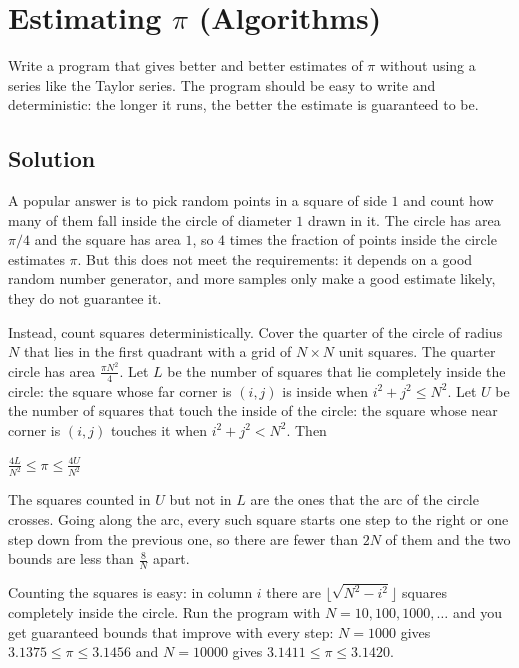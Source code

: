 \section {Estimating $\pi$ (Algorithms)}

Write a program that gives better and better estimates of $\pi$ without using a series like the Taylor series.
The program should be easy to write and deterministic: the longer it runs, the better the estimate is guaranteed to be.

\subsection{Solution}

A popular answer is to pick random points in a square of side $1$ and count how many of them fall inside the circle of diameter $1$ drawn in it.
The circle has area $\pi/4$ and the square has area $1$, so $4$ times the fraction of points inside the circle estimates $\pi$.
But this does not meet the requirements: it depends on a good random number generator,
and more samples only make a good estimate likely, they do not guarantee it.

Instead, count squares deterministically. Cover the quarter of the circle of radius $N$ that lies in the first quadrant with a grid of $N \times N$ unit squares.
The quarter circle has area $\frac{\pi N^2}{4}$.
Let $L$ be the number of squares that lie completely inside the circle: the square whose far corner is $(i,j)$ is inside when $i^2+j^2 \le N^2$.
Let $U$ be the number of squares that touch the inside of the circle: the square whose near corner is $(i,j)$ touches it when $i^2+j^2 < N^2$.
Then
\begin{center}
$\frac{4L}{N^2} \le \pi \le \frac{4U}{N^2}$
\end{center}
The squares counted in $U$ but not in $L$ are the ones that the arc of the circle crosses. Going along the arc, every such square starts one step to the
right or one step down from the previous one, so there are fewer than $2N$ of them and the two bounds are less than $\frac{8}{N}$ apart.

Counting the squares is easy: in column $i$ there are $\lfloor \sqrt{N^2-i^2} \rfloor$ squares completely inside the circle.
Run the program with $N = 10, 100, 1000, \ldots$ and you get guaranteed bounds that improve with every step:
$N=1000$ gives $3.1375 \le \pi \le 3.1456$ and $N=10000$ gives $3.1411 \le \pi \le 3.1420$.

